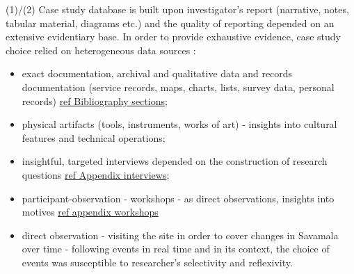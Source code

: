 \documentclass[11pt]{report}
\begin{document}
(1)/(2) Case study database is built upon investigator's report (narrative, notes, tabular material, diagrams etc.) and the quality of reporting depended on an extensive evidentiary base. In order to provide exhaustive evidence, case study choice relied on heterogeneous data sources \cite{(Yin XXX)}:
\begin{itemize}
\item exact documentation, archival and qualitative data and records documentation (service records, maps, charts, lists, survey data, personal records) \href{}{ref Bibliography sections};
\item physical artifacts (tools, instruments, works of art) - insights into cultural features and technical operations;
\item insightful, targeted interviews depended on the construction of research questions \href{}{ref Appendix interviews};
\item participant-observation - workshops -  as direct observations, insights into motives \href{}{ref appendix workshops}
\item direct observation - visiting the site in order to cover changes in Savamala over time -  following events in real time and in its context, the choice of events was susceptible to researcher's  selectivity and reflexivity.
\end{itemize}
\end{document}
